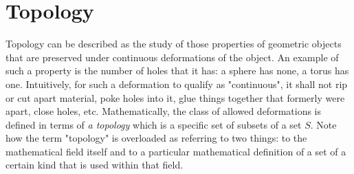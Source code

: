 \chapter{Topology}
Topology can be described as the study of those properties of geometric objects that are preserved under continuous deformations of the object. An example of such a property is the number of holes that it has: a sphere has none, a torus has one. Intuitively, for such a deformation to qualify as "continuous", it shall not rip or cut apart material, poke holes into it, glue things together that formerly were apart, close holes, etc. Mathematically, the class of allowed deformations is defined in terms of \emph{a topology} which is a specific set of subsets of a set $S$. Note how the term "topology" is overloaded as referring to two things: to the mathematical field itself and to a particular mathematical definition of a set of a certain kind that is used within that field.



\begin{comment}


https://en.wikipedia.org/wiki/Topology
https://en.wikipedia.org/wiki/Topological_space

\end{comment}
